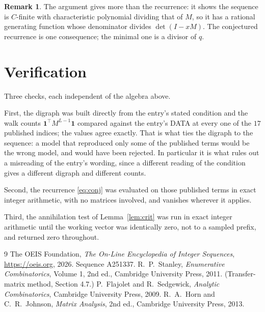 \documentclass[11pt,a4paper]{article}
\theoremstyle{plain}
\theoremstyle{definition}
\newtheorem{remark}[theorem]{Remark}
\begin{document}
\begin{remark}
The argument gives more than the recurrence: it shows the sequence is $C$-finite with
characteristic polynomial dividing that of $M$, so it has a rational generating function
whose denominator divides $\det(I-xM)$. The conjectured recurrence is one consequence; the
minimal one is a divisor of $q$.
\end{remark}

\section{Verification}

Three checks, each independent of the algebra above.

First, the digraph was built directly from the entry's stated condition and the walk counts
$\mathbf{1}^{\!\top}M^{L-1}\mathbf{1}$ compared against the entry's DATA at
every one of the $17$ published indices; the values agree exactly. That is what ties
the digraph to the sequence: a model that reproduced only some of the published terms would
be the wrong model, and would have been rejected. In particular it is what rules out a
misreading of the entry's wording, since a different reading of the condition gives a
different digraph and different counts.

Second, the recurrence \eqref{eq:conj} was evaluated on those published terms in exact
integer arithmetic, with no matrices involved, and vanishes wherever it applies.

Third, the annihilation test of Lemma~\ref{lem:crit} was run in exact integer arithmetic
until the working vector was identically zero, not to a sampled prefix, and returned zero
throughout.

\begin{thebibliography}{9}
 The OEIS Foundation, \emph{The On-Line Encyclopedia of Integer
Sequences}, \url{https://oeis.org}, 2026. Sequence A251337.
 R.~P.~Stanley, \emph{Enumerative Combinatorics}, Volume 1, 2nd ed.,
Cambridge University Press, 2011. (Transfer-matrix method, Section 4.7.)
 P.~Flajolet and R.~Sedgewick, \emph{Analytic Combinatorics}, Cambridge
University Press, 2009.
 R.~A.~Horn and C.~R.~Johnson, \emph{Matrix Analysis}, 2nd ed., Cambridge
University Press, 2013.
\end{thebibliography}
\end{document}
